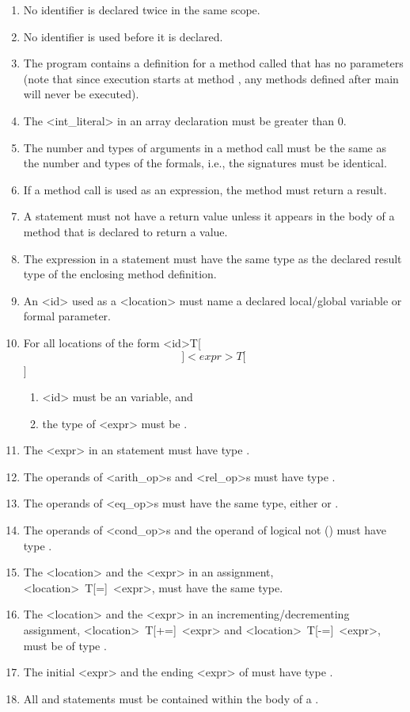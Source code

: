 \begin{enumerate}
\item No identifier is declared twice in the same scope.
\item No identifier is used before it is declared.
\item The program contains a definition for a method called 
       that has no parameters (note that since execution starts at
       method , any methods defined after main will never be 
      executed).
\item The {\bnf <int_literal>} in an array declaration must be greater
      than 0.
\item The number and types of arguments in a method call must be the same
      as the number and types of the formals, i.e., the signatures
must be identical.
\item If a method call is used as an expression, the method must
      return a result.
\item A  statement must not have a return value unless it appears
      in the body of a method that is declared to return a value.
\item The expression in a  statement must have the same type as
      the declared result type of  the enclosing method definition.
\item An {\bnf <id>} used as a {\bnf <location>} must name a declared 
      local/global variable or formal parameter.
\item For all locations of the form {\bnf <id>T[\[]<expr>T[\]]}
      \begin{enumerate}
      \item {\bnf <id>} must be an 
             variable, and 
      \item the type of {\bnf <expr>} must be .
      \end{enumerate}
\item The {\bnf <expr>} in an  statement must have type
      .
\item The operands of {\bnf <arith_op>}s and {\bnf <rel_op>}s must have type
      .
\item The operands of {\bnf <eq_op>}s must have the same type, either
       or .
\item The operands of {\bnf <cond_op>}s and the operand of logical not
      (\kw{!}) must have type .
\item The {\bnf <location>} and the {\bnf <expr>} in an assignment, 
{\bnf <location>~T[=]~<expr>}, must have the same type.
\item The {\bnf <location>} and the {\bnf <expr>} in an
incrementing/decrementing assignment,
{\bnf <location>~T[+=]~<expr>} and {\bnf <location>~T[-=]~<expr>}, must be of type .
\item The initial {\bnf <expr>} and the ending {\bnf <expr>} of
   must have type .
\item All  and  statements must be contained within 
      the body of a .
\end{enumerate}
